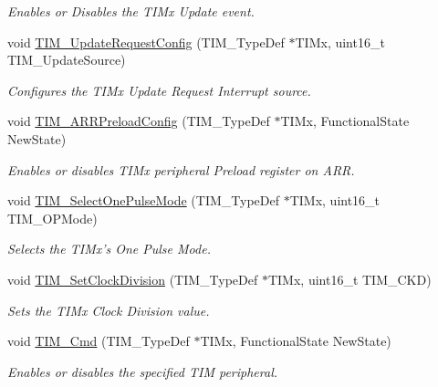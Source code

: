 \begin{DoxyCompactItemize}
\begin{DoxyCompactList}\small\item\em Enables or Disables the T\-I\-Mx Update event. \end{DoxyCompactList}\item 
void \hyperlink{group___t_i_m___group1_ga1d7a8f952e209de142499e67a653fc1f}{T\-I\-M\-\_\-\-Update\-Request\-Config} (T\-I\-M\-\_\-\-Type\-Def $\ast$T\-I\-Mx, uint16\-\_\-t T\-I\-M\-\_\-\-Update\-Source)
\begin{DoxyCompactList}\small\item\em Configures the T\-I\-Mx Update Request Interrupt source. \end{DoxyCompactList}\item 
void \hyperlink{group___t_i_m___group1_ga42b44b9fc2b0798d733720dd6bac1ac0}{T\-I\-M\-\_\-\-A\-R\-R\-Preload\-Config} (T\-I\-M\-\_\-\-Type\-Def $\ast$T\-I\-Mx, Functional\-State New\-State)
\begin{DoxyCompactList}\small\item\em Enables or disables T\-I\-Mx peripheral Preload register on A\-R\-R. \end{DoxyCompactList}\item 
void \hyperlink{group___t_i_m___group1_gadd2cca5fac6c1291dc4339098d5c9562}{T\-I\-M\-\_\-\-Select\-One\-Pulse\-Mode} (T\-I\-M\-\_\-\-Type\-Def $\ast$T\-I\-Mx, uint16\-\_\-t T\-I\-M\-\_\-\-O\-P\-Mode)
\begin{DoxyCompactList}\small\item\em Selects the T\-I\-Mx's One Pulse Mode. \end{DoxyCompactList}\item 
void \hyperlink{group___t_i_m___group1_ga20ef804dc32c723662d11ee7da3baab2}{T\-I\-M\-\_\-\-Set\-Clock\-Division} (T\-I\-M\-\_\-\-Type\-Def $\ast$T\-I\-Mx, uint16\-\_\-t T\-I\-M\-\_\-\-C\-K\-D)
\begin{DoxyCompactList}\small\item\em Sets the T\-I\-Mx Clock Division value. \end{DoxyCompactList}\item 
void \hyperlink{group___t_i_m___group1_ga2bdc275bcbd2ce9d1ba632e6c89896b7}{T\-I\-M\-\_\-\-Cmd} (T\-I\-M\-\_\-\-Type\-Def $\ast$T\-I\-Mx, Functional\-State New\-State)
\begin{DoxyCompactList}\small\item\em Enables or disables the specified T\-I\-M peripheral. \end{DoxyCompactList}\end{DoxyCompactItemize}


